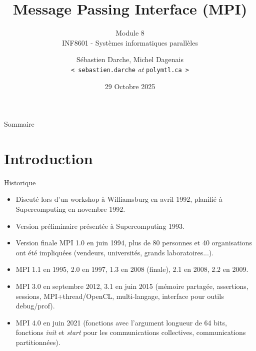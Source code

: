 \documentclass[10pt]{beamer}
\begin{document}

\title[]{Message Passing Interface (MPI)} 
\subtitle{Module 8 \\
INF8601 - Systèmes informatiques parallèles}
\author{Sébastien Darche, Michel Dagenais\\\texttt{< sebastien.darche} \textit{at} \texttt{polymtl.ca >}} 
\date{29 Octobre 2025} 

\begin{frame}[plain]
  \titlepage
\end{frame}

\begin{frame}{Sommaire}
  \tableofcontents
\end{frame}

\section{Introduction}

\begin{frame}{Historique}

  \begin{itemize}
    \item Discuté lors d'un workshop à Williamsburg en avril 1992, planifié à Supercomputing en novembre 1992.

    \item Version préliminaire présentée à Supercomputing 1993.

    \item Version finale MPI 1.0 en juin 1994, plus de 80 personnes et 40 organisations ont été impliquées (vendeurs, universités, grands laboratoires...).

    \item MPI 1.1 en 1995, 2.0 en 1997, 1.3 en 2008 (finale), 2.1 en 2008, 2.2 en 2009.

    \item MPI 3.0 en septembre 2012, 3.1 en juin 2015 (mémoire partagée, assertions, sessions, MPI+thread/OpenCL, multi-langage, interface pour outils debug/prof).

    \item MPI 4.0 en juin 2021 (fonctions avec l'argument longueur de 64 bits, fonctions \emph{init} et \emph{start} pour les communications collectives, communications partitionnées).

  \end{itemize}
\end{frame}
\end{document}
